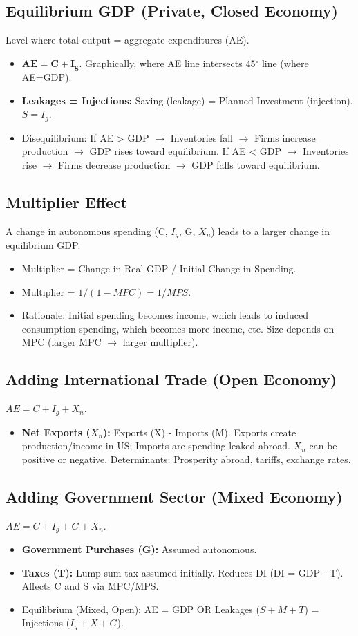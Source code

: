 \documentclass{article}
\begin{document}
\subsection*{Equilibrium GDP (Private, Closed Economy)}
Level where total output = aggregate expenditures (AE).
\begin{itemize}
    \item $\mathbf{AE = C + I_g.}$ Graphically, where AE line intersects 45$^\circ$ line (where AE=GDP).
    \item \textbf{Leakages = Injections:} Saving (leakage) = Planned Investment (injection). $S = I_g$.
    \item Disequilibrium: If AE > GDP $\rightarrow$ Inventories fall $\rightarrow$ Firms increase production $\rightarrow$ GDP rises toward equilibrium. If AE < GDP $\rightarrow$ Inventories rise $\rightarrow$ Firms decrease production $\rightarrow$ GDP falls toward equilibrium.
\end{itemize}

\subsection*{Multiplier Effect}
A change in autonomous spending (C, $I_g$, G, $X_n$) leads to a larger change in equilibrium GDP.
\begin{itemize}
    \item Multiplier = Change in Real GDP / Initial Change in Spending.
    \item Multiplier = $1 / (1 - MPC) = 1 / MPS$.
    \item Rationale: Initial spending becomes income, which leads to induced consumption spending, which becomes more income, etc. Size depends on MPC (larger MPC $\rightarrow$ larger multiplier).
\end{itemize}

\subsection*{Adding International Trade (Open Economy)}
$AE = C + I_g + X_n$.
\begin{itemize}
    \item \textbf{Net Exports ($X_n$):} Exports (X) - Imports (M). Exports create production/income in US; Imports are spending leaked abroad. $X_n$ can be positive or negative. Determinants: Prosperity abroad, tariffs, exchange rates.
\end{itemize}

\subsection*{Adding Government Sector (Mixed Economy)}
$AE = C + I_g + G + X_n$.
\begin{itemize}
    \item \textbf{Government Purchases (G):} Assumed autonomous.
    \item \textbf{Taxes (T):} Lump-sum tax assumed initially. Reduces DI (DI = GDP - T). Affects C and S via MPC/MPS.
    \item Equilibrium (Mixed, Open): AE = GDP OR Leakages ($S + M + T$) = Injections ($I_g + X + G$).
\end{itemize}
\end{document}
